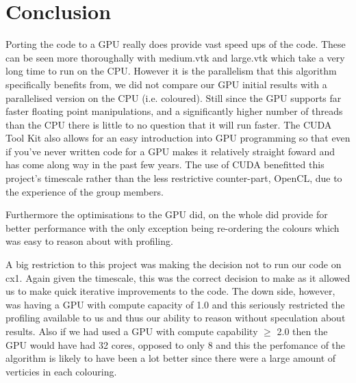 \section*{Conclusion}
Porting the code to a GPU really does provide vast speed ups of the code. These can be seen more thoroughally with medium.vtk and large.vtk which take a very long time to run on the CPU.
However it is the parallelism that this algorithm specifically benefits from, we did not compare our GPU initial results with a parallelised version on the CPU (i.e. coloured). Still since the GPU supports far faster floating point manipulations, and a significantly higher number of threads than the CPU there is little to no question that it will run faster.
The CUDA Tool Kit also allows for an easy introduction into GPU programming so that even if you've never written code for a GPU makes it relatively straight foward and has come along way in the past few years. The use of CUDA benefitted this project's timescale rather than the less restrictive counter-part, OpenCL, due to the experience of the group members.

Furthermore the optimisations to the GPU did, on the whole did provide for better performance with the only exception being re-ordering the colours which was easy to reason about with profiling.

A big restriction to this project was making the decision not to run our code on cx1. Again given the timescale, this was the correct decision to make as it allowed us to make quick iterative improvements to the code. The down side, however, was having a GPU with compute capacity of 1.0 and this seriously restricted the profiling available to us and thus our ability to reason without speculation about results.
Also if we had used a GPU with compute capability $\ge$ 2.0 then the GPU would have had 32 cores\cite{compute_2.0}, opposed to only 8 and this the perfomance of the algorithm is likely to have been a lot better since there were a large amount of verticies in each colouring.